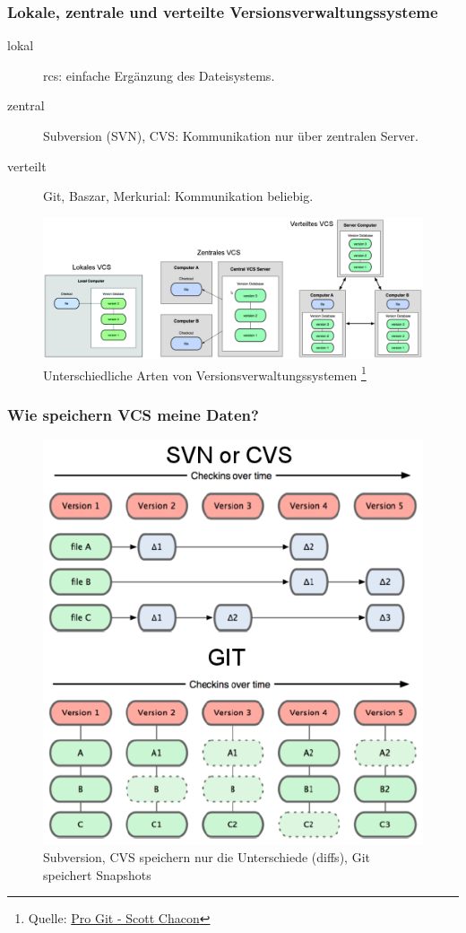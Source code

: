 \documentclass{beamer}
\begin{document}
\begin{frame}\frametitle{Lokale, zentrale und verteilte Versionsverwaltungssysteme}
\begin{description}
\item[lokal] rcs: einfache Ergänzung des Dateisystems.
\item[zentral] Subversion (SVN), CVS: Kommunikation nur über zentralen Server.
\item[verteilt] Git, Baszar, Merkurial: Kommunikation beliebig.

\end{description}

\begin{figure}
\includegraphics[scale=.15]{Bilder/VCSArten}
\caption{Unterschiedliche Arten von Versionsverwaltungssystemen
 \footnote{Quelle: \href{http://progit.org/}{Pro Git - Scott Chacon}}}
\end{figure}
\end{frame}

\begin{frame}\frametitle{Wie speichern VCS meine Daten?}

\begin{figure}
\includegraphics[scale=.35]{Bilder/fileSave}
\caption{Subversion, CVS speichern nur die Unterschiede (diffs), Git speichert Snapshots}
\end{figure}
\end{frame}
\end{document}
